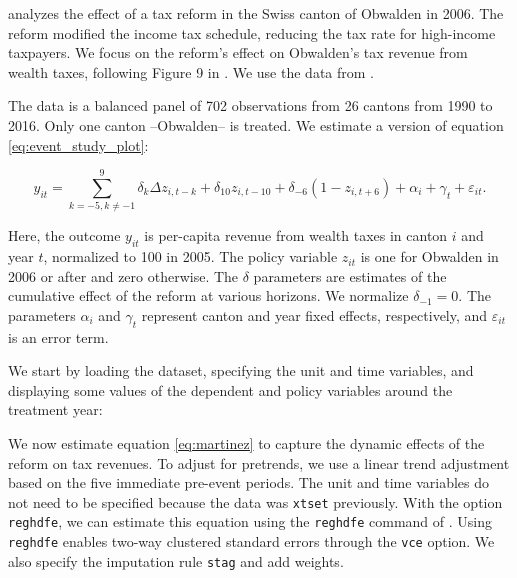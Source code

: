 \documentclass[12pt]{article}
\begin{document}
\citet{martinez2022mobility} analyzes the effect of a tax reform in the Swiss canton of Obwalden in 2006.
The reform modified the income tax schedule, reducing the tax rate for high-income taxpayers.
We focus on the reform's effect on Obwalden's tax revenue from wealth taxes, following Figure 9 in \citet{martinez2022mobility}.
We use the data from \citet{martinez2023data}.

The data is a balanced panel of 702 observations from 26 cantons from 1990 to 2016.
Only one canton --Obwalden-- is treated.
We estimate a version of equation \eqref{eq:event_study_plot}:

\begin{equation}\label{eq:martinez}
y_{it} = \sum_{k=-5,k\neq -1}^{9}\delta_k \Delta z_{i,t-k} + \delta_{10} z_{i,t-10} + \delta_{-6}(1-z_{i,t+6}) + \alpha_{i} + \gamma_{t} + \varepsilon_{it}.
\end{equation}

Here, the outcome $y_{it}$ is per-capita revenue from wealth taxes in canton $i$ and year $t$, normalized to 100 in 2005.
The policy variable $z_{it}$ is one for Obwalden in 2006 or after and zero otherwise.
The $\delta$ parameters are estimates of the cumulative effect of the reform at various horizons.
We normalize $\delta_{-1} = 0$.
The parameters $\alpha_i$ and $\gamma_{t}$ represent canton and year fixed effects, respectively, and $\varepsilon_{it}$ is an error term.

We start by loading the dataset, specifying the unit and time variables, and displaying some values of the dependent and policy variables around the treatment year:

\begin{stlog}
	\nullskip
\end{stlog}

We now estimate equation \eqref{eq:martinez} to capture the dynamic effects of the reform on tax revenues.
To adjust for pretrends, we use a linear trend adjustment based on the five immediate pre-event periods.
The unit and time variables do not need to be specified because the data was \texttt{xtset} previously.
With the option \texttt{reghdfe}, we can estimate this equation using the \texttt{reghdfe} command of \citet{Correia2017:HDFE}.
Using \texttt{reghdfe} enables two-way clustered standard errors through the \texttt{vce} option.
We also specify the imputation rule \texttt{stag} and add weights.

\begin{stlog}
	\nullskip
\end{stlog}
\end{document}
